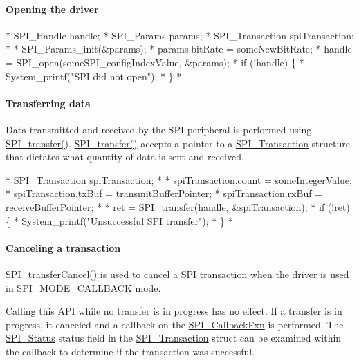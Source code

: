 \paragraph*{Opening the driver}


\begin{DoxyCode}
*  SPI_Handle      handle;
*  SPI_Params      params;
*  SPI_Transaction spiTransaction;
*
*  SPI_Params_init(&params);
*  params.bitRate  = someNewBitRate;
*  handle = SPI_open(someSPI\_configIndexValue, &params);
*  \textcolor{keywordflow}{if} (!handle) \{
*      System\_printf(\textcolor{stringliteral}{"SPI did not open"});
*  \}
*  
\end{DoxyCode}


\paragraph*{Transferring data}

Data transmitted and received by the S\-P\-I peripheral is performed using \hyperlink{_s_p_i_8h_a989e17f96b54fcc3dc2cac5f8ac6bdb2}{S\-P\-I\-\_\-transfer()}. \hyperlink{_s_p_i_8h_a989e17f96b54fcc3dc2cac5f8ac6bdb2}{S\-P\-I\-\_\-transfer()} accepts a pointer to a \hyperlink{struct_s_p_i___transaction}{S\-P\-I\-\_\-\-Transaction} structure that dictates what quantity of data is sent and received.


\begin{DoxyCode}
*  SPI_Transaction spiTransaction;
*
*  spiTransaction.count = someIntegerValue;
*  spiTransaction.txBuf = transmitBufferPointer;
*  spiTransaction.rxBuf = receiveBufferPointer;
*
*  ret = SPI_transfer(handle, &spiTransaction);
*  \textcolor{keywordflow}{if} (!ret) \{
*      System\_printf(\textcolor{stringliteral}{"Unsuccessful SPI transfer"});
*  \}
*  
\end{DoxyCode}


\paragraph*{Canceling a transaction}

\hyperlink{_s_p_i_8h_a6819f7761fc3505c4f885653ff8121f0}{S\-P\-I\-\_\-transfer\-Cancel()} is used to cancel a S\-P\-I transaction when the driver is used in \hyperlink{_s_p_i_8h_ab9ea76c6529d6076eee5e1c4a5a92c6fa5631e69925c47a62a261c78ebbda39fb}{S\-P\-I\-\_\-\-M\-O\-D\-E\-\_\-\-C\-A\-L\-L\-B\-A\-C\-K} mode.

Calling this A\-P\-I while no transfer is in progress has no effect. If a transfer is in progress, it canceled and a callback on the \hyperlink{_s_p_i_8h_aeb03e7608a14021c3b0acf92c90e2168}{S\-P\-I\-\_\-\-Callback\-Fxn} is performed. The \hyperlink{_s_p_i_8h_adf1c6e6f919dd9f6887da6590a52fd6a}{S\-P\-I\-\_\-\-Status} status field in the \hyperlink{struct_s_p_i___transaction}{S\-P\-I\-\_\-\-Transaction} struct can be examined within the callback to determine if the transaction was successful.


